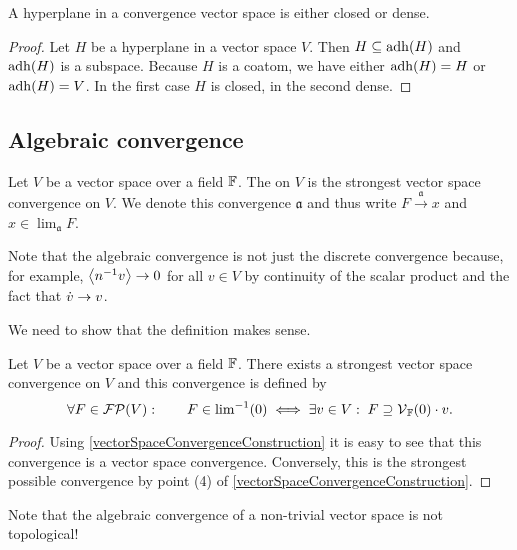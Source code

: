 \begin{corollary} \label{hyperplaneClosedDense}
A hyperplane in a convergence vector space is either closed or dense.
\end{corollary}
\begin{proof}
Let $H$ be a hyperplane in a vector space $V$. Then $H \subseteq \operatorname{adh}(H)$ and $\operatorname{adh}(H)$ is a subspace. Because $H$ is a coatom, we have either $\operatorname{adh}(H) = H$ or $\operatorname{adh}(H) = V$. In the first case $H$ is closed, in the second dense.
\end{proof}

\subsection{Algebraic convergence}
\begin{definition}
Let $V$ be a vector space over a field $\mathbb{F}$. The  on $V$ is the strongest vector space convergence on $V$. We denote this convergence $\mathfrak{a}$ and thus write $F \overset{\mathfrak{a}}{\longrightarrow} x$ and $x\in \lim_\mathfrak{a} F$.
\end{definition}
Note that the algebraic convergence is not just the discrete convergence because, for example, $\left\langle n^{-1}v \right\rangle \to 0$ for all $v\in V$ by continuity of the scalar product and the fact that $\dot{v} \to v$.


We need to show that the definition makes sense.
\begin{proposition} \label{algebraicConvergence}
Let $V$ be a vector space over a field $\mathbb{F}$. There exists a strongest vector space convergence on $V$ and this convergence is defined by
\[ \forall F\in \operatorname{\mathcal{FP}}(V): \qquad F\in {\lim}^{-1}(0) \iff \exists v\in V: \;F \supseteq \operatorname{\mathcal{V}}_{\mathbb{F}}(0)\cdot v.  \]
\end{proposition}
\begin{proof}
Using \ref{vectorSpaceConvergenceConstruction} it is easy to see that this convergence is a vector space convergence. Conversely, this is the strongest possible convergence by point (4) of \ref{vectorSpaceConvergenceConstruction}.
\end{proof}
Note that the algebraic convergence of a non-trivial vector space is not topological!

